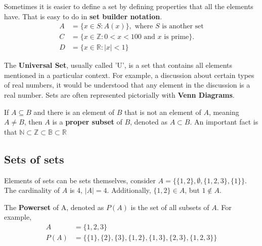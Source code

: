 Sometimes it is easier to define a set by defining properties that all the elements have.
That is easy to do in \textbf{set builder notation}.
\begin{align*}
  A & = \{x \in S: A(x)\}, \text{ where $S$ is another set}                \\
  C & = \{x \in \mathbb{Z}: 0 < x < 100 \text{ and } x \text{ is prime}\}. \\
  D & = \{x \in \mathbb{R}: \left\lvert x\right\rvert < 1\}
\end{align*}

The \textbf{Universal Set}, usually called 'U', is a set that contains all elements mentioned in a particular context.
For example, a discussion about certain types of real numbers, it would be understood that any element in the discussion
is a real number. Sets are often represented pictorially with \textbf{Venn Diagrams}.

\begin{center}
\end{center}

If $A \subseteq B$ and there is an element of $B$ that is not an element of $A$, meaning $A \not = B$,
then $A$ is a \textbf{proper subset} of $B$, denoted as $A \subset B$. An important fact is that
$\mathbb{N} \subset \mathbb{Z} \subset \mathbb{B} \subset \mathbb{R}$

\subsection{Sets of sets}

Elements of sets can be sets themselves, consider $A = \{\{1, 2\}, \emptyset, \{1, 2, 3\}, \{1\}\}$.
The cardinality of $A$ is 4, $\left\lvert A\right\rvert = 4$. Additionally, $\{1, 2\} \in A$, but
$1 \not \in A$.

The \textbf{Powerset} of A, denoted as $P(A)$ is the set of all subsets of $A$. For example,
\begin{align*}
  A    & = \{1, 2, 3\}                                                        \\
  P(A) & = \{\{1\}, \{2\}, \{3\}, \{1, 2\}, \{1, 3\}, \{2, 3\}, \{1, 2, 3\}\}
\end{align*}

